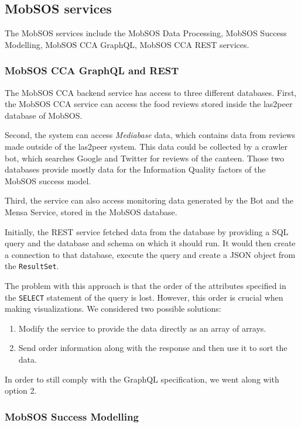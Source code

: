 \subsection{MobSOS services}
The MobSOS services include the MobSOS Data Processing, MobSOS Success Modelling, MobSOS CCA GraphQL, MobSOS CCA REST services.

\subsubsection{MobSOS CCA GraphQL and REST}
The MobSOS CCA backend service has access to three different databases. First, the MobSOS CCA service can access the food reviews stored inside the las2peer database of MobSOS.

Second, the system can access \emph{Mediabase} data, which contains data from reviews made outside of the las2peer system. 
This data could be collected by a crawler bot, which searches Google and Twitter for reviews of the canteen. 
Those two databases provide mostly data for the Information Quality factors of the MobSOS success model.

Third, the service can also access monitoring data generated by the Bot and the Mensa Service, stored in the MobSOS database. 

Initially, the REST service fetched data from the database by providing a SQL query and the database and schema on which it should run. It would then create a connection to that database, execute the query and create a JSON object from the \texttt{ResultSet}. 

The problem with this approach is that the order of the attributes specified in the \texttt{SELECT} statement of the query is lost.
However, this order is crucial when making visualizations. 
We considered two possible solutions:
\begin{enumerate}
    \item Modify the service to provide the data directly as an array of arrays.
    \item Send order information along with the response and then use it to sort the data.
\end{enumerate}
In order to still comply with the GraphQL specification, we went along with option 2. 




\subsubsection{MobSOS Success Modelling}

